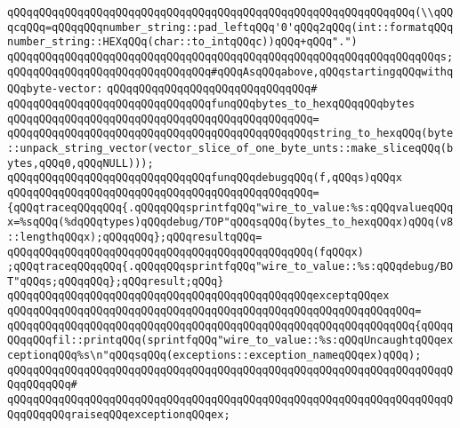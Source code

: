 \verb|qQQqqQQqqQQqqQQqqQQqqQQqqQQqqQQqqQQqqQQqqQQqqQQqqQQqqQQqqQQqqQQq(\\qQQqcqQQq=qQQqqQQqnumber_string::pad_leftqQQq'0'qQQq2qQQq(int::formatqQQqnumber_string::HEXqQQq(char::to_intqQQqc))qQQq+qQQq".")|\newline
\verb|qQQqqQQqqQQqqQQqqQQqqQQqqQQqqQQqqQQqqQQqqQQqqQQqqQQqqQQqqQQqqQQqqQQqs;|\newline
\newline
\verb|qQQqqQQqqQQqqQQqqQQqqQQqqQQqqQQq#qQQqAsqQQqabove,qQQqstartingqQQqwithqQQqbyte-vector:|\newline
\verb|qQQqqQQqqQQqqQQqqQQqqQQqqQQqqQQq#|\newline
\verb|qQQqqQQqqQQqqQQqqQQqqQQqqQQqqQQqfunqQQqbytes_to_hexqQQqqQQqbytes|\newline
\verb|qQQqqQQqqQQqqQQqqQQqqQQqqQQqqQQqqQQqqQQqqQQqqQQq=|\newline
\verb|qQQqqQQqqQQqqQQqqQQqqQQqqQQqqQQqqQQqqQQqqQQqqQQqstring_to_hexqQQq(byte::unpack_string_vector(vector_slice_of_one_byte_unts::make_sliceqQQq(bytes,qQQq0,qQQqNULL)));|\newline
\newline
\verb|qQQqqQQqqQQqqQQqqQQqqQQqqQQqqQQqfunqQQqdebugqQQq(f,qQQqs)qQQqx|\newline
\verb|qQQqqQQqqQQqqQQqqQQqqQQqqQQqqQQqqQQqqQQqqQQqqQQq=|\newline
\verb|{qQQqtraceqQQqqQQq{.qQQqqQQqsprintfqQQq"wire_to_value:%s:qQQqvalueqQQqx=%sqQQq(%dqQQqtypes)qQQqdebug/TOP"qQQqsqQQq(bytes_to_hexqQQqx)qQQq(v8::lengthqQQqx);qQQqqQQq};qQQqresultqQQq=|\newline
\verb|qQQqqQQqqQQqqQQqqQQqqQQqqQQqqQQqqQQqqQQqqQQqqQQq(fqQQqx)|\newline
\verb|;qQQqtraceqQQqqQQq{.qQQqqQQqsprintfqQQq"wire_to_value::%s:qQQqdebug/BOT"qQQqs;qQQqqQQq};qQQqresult;qQQq}|\newline
\verb|qQQqqQQqqQQqqQQqqQQqqQQqqQQqqQQqqQQqqQQqqQQqqQQqexceptqQQqex|\newline
\verb|qQQqqQQqqQQqqQQqqQQqqQQqqQQqqQQqqQQqqQQqqQQqqQQqqQQqqQQqqQQqqQQq=|\newline
\verb|qQQqqQQqqQQqqQQqqQQqqQQqqQQqqQQqqQQqqQQqqQQqqQQqqQQqqQQqqQQqqQQq{qQQqqQQqqQQqfil::printqQQq(sprintfqQQq"wire_to_value::%s:qQQqUncaughtqQQqexceptionqQQq%s\n"qQQqsqQQq(exceptions::exception_nameqQQqex)qQQq);|\newline
\verb|qQQqqQQqqQQqqQQqqQQqqQQqqQQqqQQqqQQqqQQqqQQqqQQqqQQqqQQqqQQqqQQqqQQqqQQqqQQqqQQq#|\newline
\verb|qQQqqQQqqQQqqQQqqQQqqQQqqQQqqQQqqQQqqQQqqQQqqQQqqQQqqQQqqQQqqQQqqQQqqQQqqQQqqQQqraiseqQQqexceptionqQQqex;|\newline
